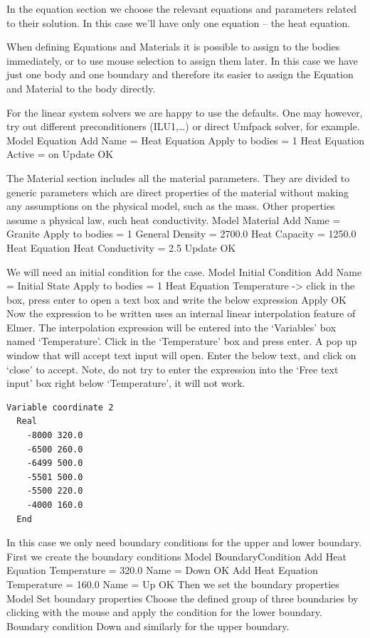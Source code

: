 In the equation section we choose the relevant equations and parameters related to their solution. 
In this case we'll have only one equation -- the heat equation.


When defining Equations and Materials it is possible to assign to the bodies immediately,
or to use mouse selection to assign them later. In this case we have just one body and 
one boundary and therefore its easier to assign the Equation and Material to the body directly.

For the linear system solvers we are happy to use the defaults. One may however, try out different
preconditioners (ILU1,\ldots) or direct Umfpack solver, for example.
\ttbegin
Model
  Equation
    Add 
      Name = Heat Equation
      Apply to bodies = 1
      Heat Equation
        Active = on
  Update   
  OK
\ttend        

The Material section includes all the material parameters.
They are divided to generic parameters which are direct properties of the material
without making any assumptions on the physical model, such as the mass. Other properties assume
a physical law, such heat conductivity.
\ttbegin
Model
  Material
    Add 
      Name = Granite
      Apply to bodies = 1 
      General    
        Density = 2700.0
        Heat Capacity = 1250.0
      Heat Equation
        Heat Conductivity = 2.5
    Update
    OK
\ttend

We will need an initial condition for the case. 
\ttbegin
Model
  Initial Condition
    Add 
      Name = Initial State
      Apply to bodies = 1
      Heat Equation
        Temperature -> click in the box, press enter to open a text box and write the below expression
    Apply
    OK
\ttend    
Now the expression to be written uses an internal linear interpolation feature of Elmer.  The 
interpolation expression will be entered into the `Variables' box named `Temperature'.  Click in
the `Temperature' box and press enter.  A pop up window that will accept text input will open. 
Enter the below text, and click on `close' to accept.  Note, do not try to enter the expression
into the `Free text input' box right below `Temperature', it will not work.
\begin{verbatim}
Variable coordinate 2
  Real
    -8000 320.0
    -6500 260.0
    -6499 500.0
    -5501 500.0
    -5500 220.0
    -4000 160.0
  End
\end{verbatim}

In this case we only need boundary conditions for the upper and lower boundary.
First we create the boundary conditions
\ttbegin
Model
  BoundaryCondition
    Add 
      Heat Equation
        Temperature = 320.0
      Name = Down
      OK
    Add 
      Heat Equation
        Temperature = 160.0
      Name = Up
      OK
\ttend   
Then we set the boundary properties 
\ttbegin
Model 
  Set boundary properties  
\ttend
Choose the defined group of three boundaries by clicking with the mouse
and apply the condition for the lower boundary.
\ttbegin
Boundary condition
  Down
\ttend
and similarly for the upper boundary. 


